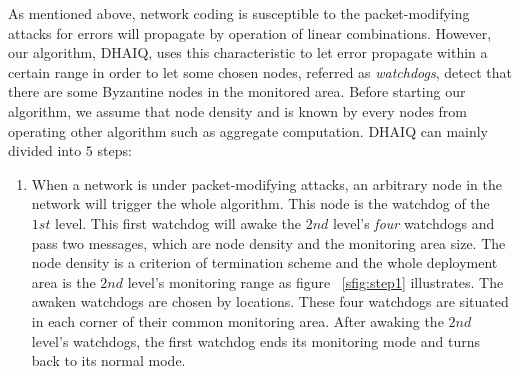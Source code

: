 \documentclass[conference]{IEEEtran}
\begin{document}
As mentioned above, network coding is susceptible to the packet-modifying attacks for errors will propagate by operation of linear combinations. However, our algorithm, DHAIQ, uses this characteristic to let error propagate within a certain range in order to let some chosen nodes, referred as \emph{watchdogs}, detect that there are some Byzantine nodes in the monitored area. Before starting our algorithm, we assume that node density and is known by every nodes from operating other algorithm such as aggregate computation. DHAIQ can mainly divided into $5$ steps:\\
\begin{enumerate}
\item \label{st1}When a network is under packet-modifying attacks, an arbitrary node in the network will trigger the whole algorithm. This node is the watchdog of the $1st$ level. This first watchdog will awake the $2nd$ level's \emph{four} watchdogs and pass two messages, which are node density and the monitoring area size. The node density is a criterion of termination scheme and the whole deployment area is the $2nd$ level's monitoring range as figure ~\ref{sfig:step1} illustrates. The awaken watchdogs are chosen by locations. These four watchdogs are situated in each corner of their common monitoring area. After awaking the $2nd$ level's watchdogs, the first watchdog ends its monitoring mode and turns back to its normal mode.\\

\end{enumerate}
\end{document}

